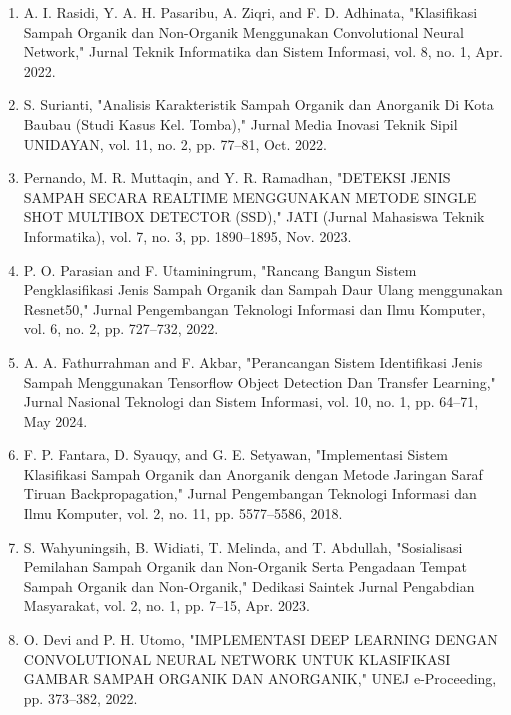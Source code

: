 \documentclass[12pt,a4paper]{article}
\begin{document}
\begin{thebibliography}{99}
\begin{enumerate}
    \item A. I. Rasidi, Y. A. H. Pasaribu, A. Ziqri, and F. D. Adhinata, "Klasifikasi Sampah Organik dan Non-Organik Menggunakan Convolutional Neural Network," Jurnal Teknik Informatika dan Sistem Informasi, vol. 8, no. 1, Apr. 2022.

    \item S. Surianti, "Analisis Karakteristik Sampah Organik dan Anorganik Di Kota Baubau (Studi Kasus Kel. Tomba)," Jurnal Media Inovasi Teknik Sipil UNIDAYAN, vol. 11, no. 2, pp. 77–81, Oct. 2022.

    \item Pernando, M. R. Muttaqin, and Y. R. Ramadhan, "DETEKSI JENIS SAMPAH SECARA REALTIME MENGGUNAKAN METODE SINGLE SHOT MULTIBOX DETECTOR (SSD)," JATI (Jurnal Mahasiswa Teknik Informatika), vol. 7, no. 3, pp. 1890–1895, Nov. 2023.

    \item P. O. Parasian and F. Utaminingrum, "Rancang Bangun Sistem Pengklasifikasi Jenis Sampah Organik dan Sampah Daur Ulang menggunakan Resnet50," Jurnal Pengembangan Teknologi Informasi dan Ilmu Komputer, vol. 6, no. 2, pp. 727–732, 2022.

    \item A. A. Fathurrahman and F. Akbar, "Perancangan Sistem Identifikasi Jenis Sampah Menggunakan Tensorflow Object Detection Dan Transfer Learning," Jurnal Nasional Teknologi dan Sistem Informasi, vol. 10, no. 1, pp. 64–71, May 2024.

    \item F. P. Fantara, D. Syauqy, and G. E. Setyawan, "Implementasi Sistem Klasifikasi Sampah Organik dan Anorganik dengan Metode Jaringan Saraf Tiruan Backpropagation," Jurnal Pengembangan Teknologi Informasi dan Ilmu Komputer, vol. 2, no. 11, pp. 5577–5586, 2018.

    \item S. Wahyuningsih, B. Widiati, T. Melinda, and T. Abdullah, "Sosialisasi Pemilahan Sampah Organik dan Non-Organik Serta Pengadaan Tempat Sampah Organik dan Non-Organik," Dedikasi Saintek Jurnal Pengabdian Masyarakat, vol. 2, no. 1, pp. 7–15, Apr. 2023.

    \item O. Devi and P. H. Utomo, "IMPLEMENTASI DEEP LEARNING DENGAN CONVOLUTIONAL NEURAL NETWORK UNTUK KLASIFIKASI GAMBAR SAMPAH ORGANIK DAN ANORGANIK," UNEJ e-Proceeding, pp. 373–382, 2022.

\end{enumerate}
\end{thebibliography}
\end{document}
